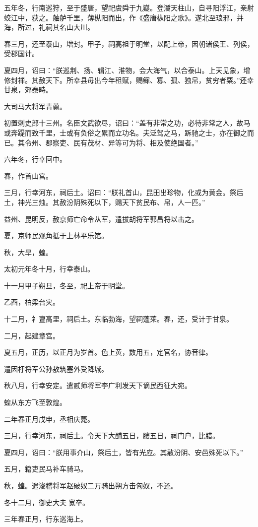 \documentclass[]{article}
\begin{document}
五年冬，行南巡狩，至于盛唐，望祀虞舜于九嶷。登灊天柱山，自寻阳浮江，亲射蛟江中，获之。舳舻千里，薄枞阳而出，作《盛唐枞阳之歌》。遂北至琅邪，并海，所过，礼祠其名山大川。

春三月，还至泰山，增封。甲子，祠高祖于明堂，以配上帝，因朝诸侯王、列侯，受郡国计。

夏四月，诏曰：``朕巡荆、扬、辑江、淮物，会大海气，以合泰山。上天见象，增修封禅。其赦天下。所幸县毋出今年租赋，赐鳏、寡、孤、独帛，贫穷者粟。''还幸甘泉，郊泰畤。

大司马大将军青薨。

初置刺史部十三州。名臣文武欲尽，诏曰：``盖有非常之功，必待非常之人，故马或奔踶而致千里，士或有负俗之累而立功名。夫泛驾之马，跅驰之士，亦在御之而已。其令州、郡察吏、民有茂材、异等可为将、相及使绝国者。''

六年冬，行幸回中。

春，作首山宫。

三月，行幸河东，祠后土。诏曰：``朕礼首山，昆田出珍物，化或为黄金。祭后土，神光三烛。其赦汾阴殊死以下，赐天下贫民布、帛，人一匹。''

益州、昆明反，赦京师亡命令从军，遣拔胡将军郭昌将以击之。

夏，京师民观角抵于上林平乐馆。

秋，大旱，蝗。

太初元年冬十月，行幸泰山。

十一月甲子朔旦，冬至，祀上帝于明堂。

乙酉，柏梁台灾。

十二月，礻亶高里，祠后土。东临勃海，望祠蓬莱。春，还，受计于甘泉。

二月，起建章宫。

夏五月，正历，以正月为岁首。色上黄，数用五，定官名，协音律。

遣因杅将军公孙敖筑塞外受降城。

秋八月，行幸安定。遣贰师将军李广利发天下谪民西征大宛。

蝗从东方飞至敦煌。

二年春正月戊申，丞相庆薨。

三月，行幸河东，祠后土。令天下大酺五日，膢五日，祠门户，比腊。

夏四月，诏曰：``朕用事介山，祭后土，皆有光应。其赦汾阴、安邑殊死以下。''

五月，籍吏民马补车骑马。

秋，蝗。遣浚稽将军赵破奴二万骑出朔方击匈奴，不还。

冬十二月，御史大夫宽卒。

三年春正月，行东巡海上。
\end{document}
